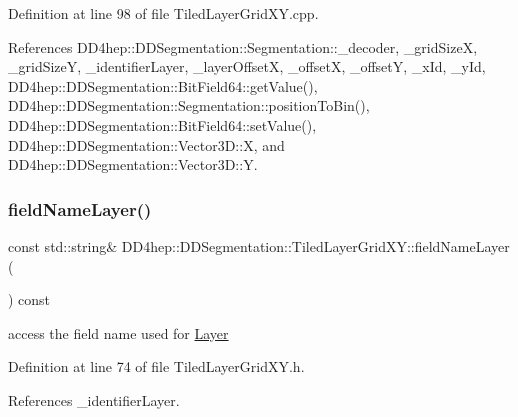 Definition at line 98 of file Tiled\+Layer\+Grid\+X\+Y.\+cpp.



References D\+D4hep\+::\+D\+D\+Segmentation\+::\+Segmentation\+::\+\_\+decoder, \+\_\+grid\+SizeX, \+\_\+grid\+SizeY, \+\_\+identifier\+Layer, \+\_\+layer\+OffsetX, \+\_\+offsetX, \+\_\+offsetY, \+\_\+x\+Id, \+\_\+y\+Id, D\+D4hep\+::\+D\+D\+Segmentation\+::\+Bit\+Field64\+::get\+Value(), D\+D4hep\+::\+D\+D\+Segmentation\+::\+Segmentation\+::position\+To\+Bin(), D\+D4hep\+::\+D\+D\+Segmentation\+::\+Bit\+Field64\+::set\+Value(), D\+D4hep\+::\+D\+D\+Segmentation\+::\+Vector3\+D\+::X, and D\+D4hep\+::\+D\+D\+Segmentation\+::\+Vector3\+D\+::Y.

\hypertarget{class_d_d4hep_1_1_d_d_segmentation_1_1_tiled_layer_grid_x_y_aff8aa3eacaf4502aa6eb21e53fdf46b0}{}\label{class_d_d4hep_1_1_d_d_segmentation_1_1_tiled_layer_grid_x_y_aff8aa3eacaf4502aa6eb21e53fdf46b0} 
\subsubsection{\texorpdfstring{field\+Name\+Layer()}{fieldNameLayer()}}
{\footnotesize\ttfamily const std\+::string\& D\+D4hep\+::\+D\+D\+Segmentation\+::\+Tiled\+Layer\+Grid\+X\+Y\+::field\+Name\+Layer (\begin{DoxyParamCaption}{ }\end{DoxyParamCaption}) const\hspace{0.3cm}{\ttfamily [inline]}}



access the field name used for \hyperlink{class_d_d4hep_1_1_layer}{Layer} 



Definition at line 74 of file Tiled\+Layer\+Grid\+X\+Y.\+h.



References \+\_\+identifier\+Layer.

\hypertarget{class_d_d4hep_1_1_d_d_segmentation_1_1_tiled_layer_grid_x_y_a87f012e8aa8b1c486b1b06fcd9bae1c6}{}\label{class_d_d4hep_1_1_d_d_segmentation_1_1_tiled_layer_grid_x_y_a87f012e8aa8b1c486b1b06fcd9bae1c6} 
